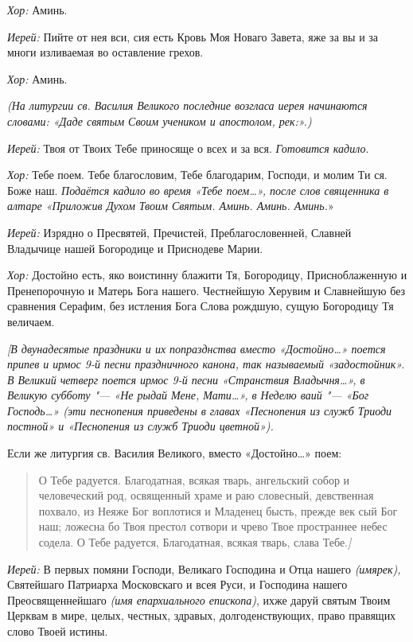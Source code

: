 \begin{mymulticols}
{\itshape Хор:} Аминь.

{\itshape Иерей:} Пийте от нея вси, сия есть Кровь Моя Новаго Завета, яже за вы и за многи изливаемая во оставление грехов.

{\itshape Хор:} Аминь. 

{\itshape (На литургии св. Василия Великого последние возгласа иерея начинаются словами: «Даде святым Своим учеником и апостолом, рек:».)}

{\itshape Иерей:} Твоя от Твоих Тебе приносяще о всех и за вся.  {\itshape Готовится кадило}.

{\itshape Хор:} Тебе поем. Тебе благословим, Тебе благодарим, Господи, и молим Ти ся. Боже наш.  {\itshape Подаётся кадило во время «Тебе поем…», после слов священника в алтаре «Приложив Духом Твоим Святым. Аминь. Аминь. Аминь.}»

{\itshape Иерей:} Изрядно о Пресвятей, Пречистей, Преблагословенней, Славней Владычице нашей Богородице и Приснодеве Марии.

{\itshape Хор:} Достойно есть, яко воистинну блажити Тя, Богородицу, Присноблаженную и Пренепорочную и Матерь Бога нашего. Честнейшую Херувим и Славнейшую без сравнения Серафим, без истления Бога Слова рождшую, сущую Богородицу Тя величаем. 

{\itshape [В двунадесятые праздники и их попразднства вместо «Достойно…» поется припев и ирмос 9-й песни праздничного канона, так называемый «задостойник». В Великий четверг поется ирмос 9-й песни «Странствия Владычня…», в Великую субботу "--- «Не рыдай Мене, Мати…», в Неделю ваий "--- «Бог Господь…» (эти песнопения приведены в главах «Песнопения из служб Триоди постной» и «Песнопения из служб Триоди цветной»).

Если же литургия св. Василия Великого, вместо «Достойно…» поем: }

\begin{quote}
О Тебе радуется. Благодатная, всякая тварь, ангельский собор и человеческий род, освященный храме и раю словесный, девственная похвало, из Неяже Бог воплотися и Младенец бысть, прежде век сый Бог наш; ложесна бо Твоя престол сотвори и чрево Твое пространнее небес содела. О Тебе радуется, Благодатная, всякая тварь, слава Тебе.{\itshape ]}
\end{quote}      

{\itshape Иерей:} В первых помяни Господи, Великаго Господина и Отца нашего  {\itshape  (имярек),} Святейшаго Патриарха Московскаго и всея Руси, и Господина нашего Преосвященнейшаго {\itshape (имя епархиального епископа)}, ихже даруй святым Твоим Церквам в мире, целых, честных, здравых, долгоденствующих, право правящих слово Твоей истины. 


\end{mymulticols}
